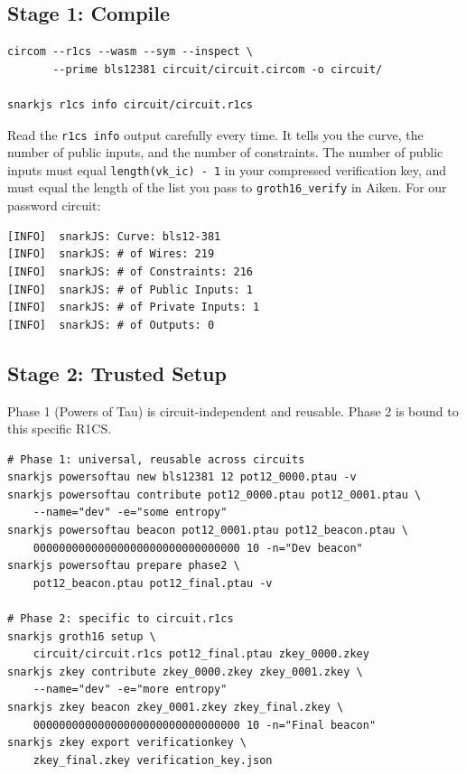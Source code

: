 \subsection*{Stage 1: Compile}

\begin{verbatim}
circom --r1cs --wasm --sym --inspect \
       --prime bls12381 circuit/circuit.circom -o circuit/

snarkjs r1cs info circuit/circuit.r1cs
\end{verbatim}

Read the \texttt{r1cs info} output carefully every time. It tells you the curve,
the number of public inputs, and the number of constraints. The number of public
inputs must equal \texttt{length(vk\_ic) - 1} in your compressed verification
key, and must equal the length of the list you pass to
\texttt{groth16\_verify} in Aiken. For our password circuit:

\begin{verbatim}
[INFO]  snarkJS: Curve: bls12-381
[INFO]  snarkJS: # of Wires: 219
[INFO]  snarkJS: # of Constraints: 216
[INFO]  snarkJS: # of Public Inputs: 1
[INFO]  snarkJS: # of Private Inputs: 1
[INFO]  snarkJS: # of Outputs: 0
\end{verbatim}

\subsection*{Stage 2: Trusted Setup}

Phase 1 (Powers of Tau) is circuit-independent and reusable. Phase 2 is bound to
this specific R1CS.

\begin{verbatim}
# Phase 1: universal, reusable across circuits
snarkjs powersoftau new bls12381 12 pot12_0000.ptau -v
snarkjs powersoftau contribute pot12_0000.ptau pot12_0001.ptau \
    --name="dev" -e="some entropy"
snarkjs powersoftau beacon pot12_0001.ptau pot12_beacon.ptau \
    00000000000000000000000000000000 10 -n="Dev beacon"
snarkjs powersoftau prepare phase2 \
    pot12_beacon.ptau pot12_final.ptau -v

# Phase 2: specific to circuit.r1cs
snarkjs groth16 setup \
    circuit/circuit.r1cs pot12_final.ptau zkey_0000.zkey
snarkjs zkey contribute zkey_0000.zkey zkey_0001.zkey \
    --name="dev" -e="more entropy"
snarkjs zkey beacon zkey_0001.zkey zkey_final.zkey \
    00000000000000000000000000000000 10 -n="Final beacon"
snarkjs zkey export verificationkey \
    zkey_final.zkey verification_key.json
\end{verbatim}

